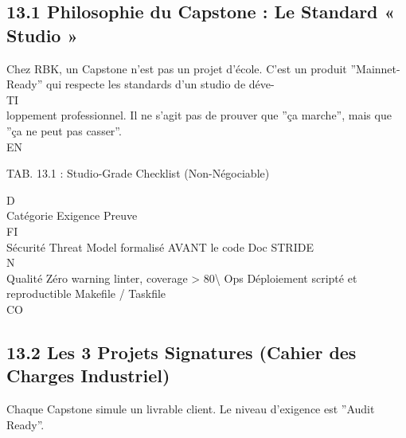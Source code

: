 \subsection{13.1 Philosophie du Capstone : Le Standard « Studio »}
Chez RBK, un Capstone n’est pas un projet d’école. C’est un produit ”Mainnet-Ready” qui respecte les standards d’un studio de déve-\\
\vspace{0.5em}
\vspace{0.5em}
\vspace{0.5em}
\vspace{0.5em}
TI\\
loppement professionnel. Il ne s’agit pas de prouver que ”ça marche”, mais que ”ça ne peut pas casser”.\\
\vspace{0.5em}
\vspace{0.5em}
\vspace{0.5em}
\vspace{0.5em}
EN\\
\begin{center}\begin{tabular}TAB. 13.1 : Studio-Grade Checklist (Non-Négociable)\end{tabular}\end{center}
\vspace{0.5em}
\vspace{0.5em}
\vspace{0.5em}
\vspace{0.5em}
D\\
Catégorie Exigence                                      Preuve\\
\vspace{0.5em}
\vspace{0.5em}
\vspace{0.5em}
\vspace{0.5em}
FI\\
Sécurité  Threat Model formalisé AVANT le code          Doc STRIDE\\
\vspace{0.5em}
\vspace{0.5em}
N\\
Qualité   Zéro warning linter, coverage \textgreater{} 80\textbackslash{}%
Ops       Déploiement scripté et reproductible          Makefile / Taskfile\\
CO\\
\vspace{0.5em}
\subsection{13.2 Les 3 Projets Signatures (Cahier des Charges Industriel)}
Chaque Capstone simule un livrable client. Le niveau d’exigence est ”Audit Ready”.\\
\vspace{0.5em}
\vspace{0.5em}
